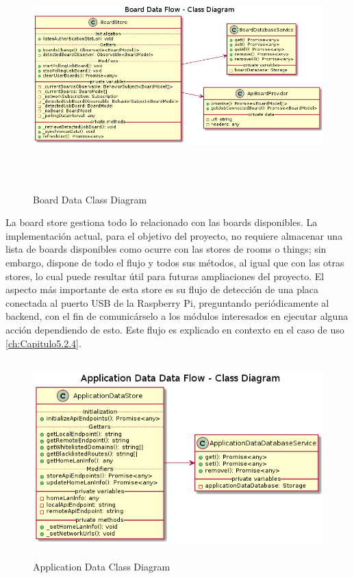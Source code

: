 \begin{figure}[hbt!]
\centering
\includegraphics[height=3.5in]{figures/diagrams/front/data-flow/board.png}
\caption[thing]{Board Data Class Diagram\footnotemark}
\end{figure}

\vspace{0.5cm}

La board store gestiona todo lo relacionado con las boards disponibles. La implementación actual, para el objetivo del proyecto, no requiere almacenar una lista de boards disponibles como ocurre con las stores de rooms o things; sin embargo, dispone de todo el flujo y todos sus métodos, al igual que con las otras stores, lo cual puede resultar útil para futuras ampliaciones del proyecto. El aspecto más importante de esta store es su flujo de detección de una placa conectada al puerto USB de la Raspberry Pi, preguntando periódicamente al backend, con el fin de comunicárselo a los módulos interesados en ejecutar alguna acción dependiendo de esto. Este flujo es explicado en contexto en el caso de uso \ref{ch:Capitulo5.2.4}.

\begin{figure}[hbt!]
\centering
\includegraphics[height=3in]{figures/diagrams/front/data-flow/app-data.png}
\caption[app-data]{Application Data Class Diagram\footnotemark}
\end{figure}


